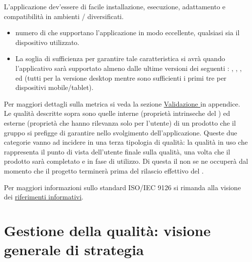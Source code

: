 \documentclass[a4paper, titlepage]{article}
\begin{document}
L'applicazione dev'essere di facile installazione, esecuzione, adattamento e compatibilità in ambienti / diversificati.
\begin{itemize}
\item {} numero di  che supportano l'applicazione in modo eccellente, qualsiasi sia il dispositivo utilizzato. 
\item {} La soglia di sufficienza per garantire tale caratteristica si avrà quando l'applicativo sarà supportato almeno dalle ultime versioni dei seguenti :  , , ,  ed  (tutti per la versione desktop mentre sono sufficienti i primi tre per dispositivi mobile/tablet).
\end{itemize}
Per maggiori dettagli sulla metrica si veda la sezione \hyperref[par:\gl{web}]{Validazione } in appendice.
\\ 
\newline Le qualità descritte sopra sono quelle interne (proprietà intrinseche del ) ed esterne (proprietà che hanno rilevanza solo per l’utente) di un prodotto  che il gruppo si prefigge di garantire nello svolgimento dell'applicazione. Queste due categorie vanno ad incidere in una terza tipologia di qualità: la qualità in uso che rappresenta il punto di vista dell'utente finale sulla qualità, una volta che il prodotto sarà completato e in fase di utilizzo. Di questa il  non se ne occuperà dal momento che il progetto terminerà prima del rilascio effettivo del .

Per maggiori informazioni sullo standard ISO/IEC 9126 si rimanda alla visione dei \hyperref[rifinfo] {riferimenti informativi}.

\section{Gestione della qualità: visione generale di strategia}
\end{document}
